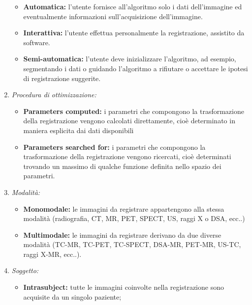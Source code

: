 \begin{enumerate}
          \begin{itemize}
              \item \textbf{Automatica:} l'utente fornisce all'algoritmo solo i dati
                    dell'immagine ed eventualmente informazioni sull'acquisizione
                    dell'immagine.
              \item \textbf{Interattiva:} l'utente effettua personalmente la registrazione,
                    assistito da software.
              \item \textbf{Semi-automatica:} l'utente deve inizializzare l'algoritmo, ad esempio, segmentando i dati o guidando l'algoritmo a rifiutare
                    o accettare le ipotesi di registrazione suggerite.
          \end{itemize}

    \item \textit{Procedura di ottimizzazione:}
          \begin{itemize}
              \item \textbf{Parameters computed:} i parametri che compongono la trasformazione della registrazione vengono calcolati direttamente, cioè determinato in maniera esplicita dai dati
                    disponibili
              \item \textbf{Parameters searched for:} i parametri che compongono la trasformazione della registrazione vengono ricercati, cioè
                    determinati trovando un massimo di qualche funzione definita nello spazio dei parametri.
          \end{itemize}
    \item \textit{Modalità:}
          \begin{itemize}
              \item \textbf{Monomodale:} le immagini da registrare appartengono alla
                    stessa modalità (radiografia, CT, MR, PET, SPECT, US,
                    raggi X o DSA, ecc..)
              \item \textbf{Multimodale:} le immagini da registrare derivano da due
                    diverse modalità (TC-MR, TC-PET, TC-SPECT, DSA-MR,
                    PET-MR, US-TC, raggi X-MR, ecc..).
          \end{itemize}
    \item \textit{Soggetto:}
          \begin{itemize}
              \item \textbf{Intrasubject:} tutte le immagini coinvolte nella registrazione
                    sono acquisite da un singolo paziente;

\end{itemize}
\end{enumerate}
